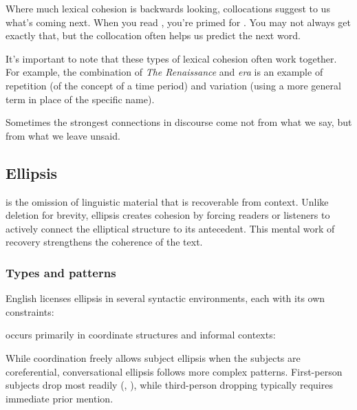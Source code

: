 Where much lexical cohesion is backwards looking, collocations suggest to us what's coming next. When you read , you're primed for . You may not always get exactly that, but the collocation often helps us predict the next word.

\bigskip

It's important to note that these types of lexical cohesion often work together. For example, the combination of \textit{\textcolor{xGreen}{The Renaissance}} and \textit{\textcolor{xGreen}{era}} is an example of repetition (of the concept of a time period) and variation (using a more general term in place of the specific name).

Sometimes the strongest connections in discourse come not from what we say, but from what we leave unsaid.

\subsection{Ellipsis}\label{sec:ellipsis}

 is the omission of linguistic material that is recoverable from context. Unlike deletion for brevity, ellipsis creates cohesion by forcing readers or listeners to actively connect the elliptical structure to its antecedent. This mental work of recovery strengthens the coherence of the text.

\subsubsection*{Types and patterns}

English licenses ellipsis in several syntactic environments, each with its own constraints:

 occurs primarily in coordinate structures and informal contexts:

\ea
{}
\z
\z
While coordination freely allows subject ellipsis when the subjects are coreferential, conversational ellipsis follows more complex patterns. First-person subjects drop most readily (, ), while third-person dropping typically requires immediate prior mention.

